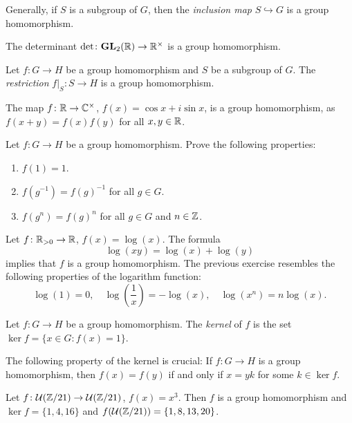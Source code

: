 Generally, if $S$ is a subgroup of $G$, 
then the \emph{inclusion map}  $S\hookrightarrow G$ is a group
homomorphism. 

\begin{example}
The determinant $\det\colon\mathbf{GL}_2(\mathbb{R})\to\mathbb{R}^\times$ is a group homomorphism. 
\end{example}

\begin{example}
    Let $f\colon G\to H$ be a group homomorphism and
    $S$ be a subgroup of $G$.
    The \emph{restriction} $f|_S\colon S\to H$ is a group homomorphism. 
\end{example}

\begin{example}
The map $f\colon\mathbb{R}\to\mathbb{C}^\times$, $f(x)=\cos x+i\sin x$, is a group
homomorphism, as 
$f(x+y)=f(x)f(y)$ for all $x,y\in\mathbb{R}$.
\end{example}

\begin{exercise}
Let $f\colon G\to H$ be a group homomorphism. Prove the following properties: 
\begin{enumerate}
    \item $f(1)=1$.
    \item $f(g^{-1})=f(g)^{-1}$ for all $g\in G$.
    \item $f(g^n)=f(g)^n$ for all $g\in G$ and $n\in\mathbb{Z}$.
\end{enumerate}
\end{exercise}

\begin{example}
Let $f\colon\mathbb{R}_{>0}\to\mathbb{R}$, $f(x)=\log(x)$. The formula 
\[\log(xy)=\log(x)+
\log(y)
\]
implies that $f$ is a group homomorphism. 
The previous exercise resembles 
the following properties of the logarithm function: 
\[
\log(1)=0,
\quad
\log\left(\frac{1}{x}\right)=-\log(x),
\quad
\log(x^n)=n\log(x).
\]
\end{example}

\begin{definition}
        Let $f\colon G\to H$ be a group homomorphism. The \emph{kernel} of $f$
        is the set 
        $\ker f=\{x\in G:f(x)=1\}$.
\end{definition}

The following property of the kernel is crucial: If $f\colon G\to H$
is a group homomorphism, then 
$f(x)=f(y)$ if and only if $x=yk$ for some $k\in\ker f$.

\begin{example}
Let $f\colon\mathcal{U}(\mathbb{Z}/21)\to\mathcal{U}(\mathbb{Z}/21)$, $f(x)=x^3$. 
Then $f$ is a group homomorphism and 
$\ker f=\{1,4,16\}$ and $f(\mathcal{U}(\mathbb{Z}/21))=\{1,8,13,20\}$.
\end{example}

